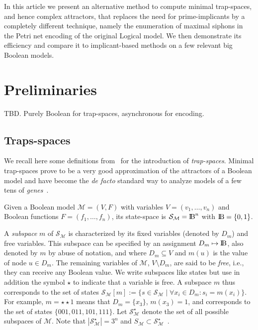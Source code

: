 \documentclass[runningheads]{llncs}
\newcommand{\bbbb}{{\rm I\!B}}
\begin{document}
In this article we present an alternative method to compute minimal trap-spaces, and hence complex attractors, that replaces the need for prime-implicants by a completely different technique, namely the enumeration of maximal siphons in the Petri net encoding of the original Logical model.
We then demonstrate its efficiency and compare it to implicant-based methods on a few relevant big Boolean models.


\section{Preliminaries}

TBD.
Purely Boolean for trap-spaces, asynchronous for encoding.

\subsection{Traps-spaces}

We recall here some definitions from~\cite{klarner2015computing} for the introduction of \emph{trap-spaces}.
Minimal trap-spaces prove to be a very good approximation of the attractors of a Boolean model and have become the \emph{de facto} standard way to analyze models of a few tens of \emph{genes}~\cite{klarner2017pyboolnet,cifuentes2020control}.

Given a Boolean model \(\mathcal{M} = (V, F)\) with variables \(V=(v_{1},\dots,v_{n})\) and Boolean functions \(F=(f_{1},\dots,f_{n})\), its state-space is \(\mathcal{S}_{\mathcal{M}} =\bbbb^{n}\) with \(\bbbb = \{0, 1\}\).

A \emph{subspace} \(m\) of \(\mathcal{S}_{\mathcal{M}}\) is characterized by its fixed variables (denoted by \(D_m\)) and free variables.
This subspace can be specified by an assignment \(D_m \mapsto \bbbb\), also denoted by \(m\) by abuse of notation, and where \(D_m \subseteq V\) and \(m(u)\) is the value of node \(u \in D_m\).
The remaining variables of \(\mathcal{M}\), \(V \setminus D_m\), are said to be \emph{free}, i.e., they can receive any Boolean value.
We write subspaces like states but use in addition the symbol \(\star\) to indicate that a variable is free.
A subspace \(m\) thus corresponds to the set of states \(\mathcal{S}_{\mathcal{M}}[m] := \{s \in \mathcal{S}_{\mathcal{M}}\;|\;\forall x_i \in D_m : s_i = m(x_i)\}\).
For example, \(m = \star\star1\) means that \(D_m = \{x_3\}\), \(m(x_3) = 1\), and corresponds to the set of states \(\{001, 011, 101, 111\}\).
Let \(\mathcal{S}_{\mathcal{M}}^{\star}\) denote the set of all possible subspaces of \(\mathcal{M}\). Note that \(\left|\mathcal{S}_{\mathcal{M}}^{\star}\right| = 3^n\) and \(S_{\mathcal{M}} \subset \mathcal{S}_{\mathcal{M}}^{\star}\)~\cite{klarner2015computing}.
\end{document}
